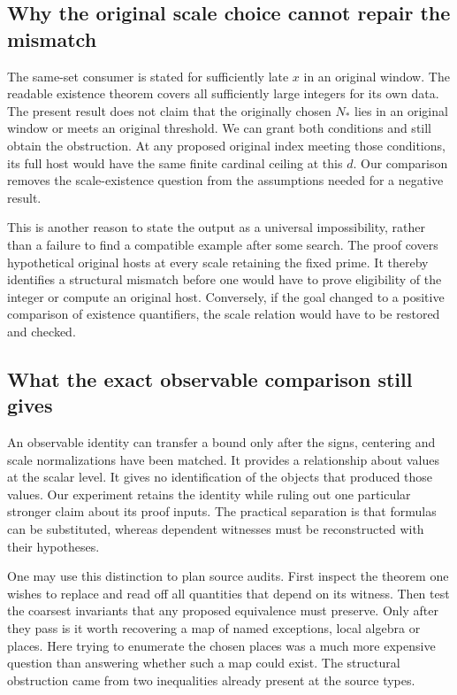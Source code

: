 \documentclass[12pt,letterpaper]{article}
\begin{document}
\subsection{Why the original scale choice cannot repair the mismatch}
The same-set consumer is stated for sufficiently late $x$ in an original window. The readable existence theorem covers all sufficiently large integers for its own data. The present result does not claim that the originally chosen $N_*$ lies in an original window or meets an original threshold. We can grant both conditions and still obtain the obstruction. At any proposed original index meeting those conditions, its full host would have the same finite cardinal ceiling at this $d$. Our comparison removes the scale-existence question from the assumptions needed for a negative result.

This is another reason to state the output as a universal impossibility, rather than a failure to find a compatible example after some search. The proof covers hypothetical original hosts at every scale retaining the fixed prime. It thereby identifies a structural mismatch before one would have to prove eligibility of the integer or compute an original host. Conversely, if the goal changed to a positive comparison of existence quantifiers, the scale relation would have to be restored and checked.

\subsection{What the exact observable comparison still gives}
An observable identity can transfer a bound only after the signs, centering and scale normalizations have been matched. It provides a relationship about values at the scalar level. It gives no identification of the objects that produced those values. Our experiment retains the identity while ruling out one particular stronger claim about its proof inputs. The practical separation is that formulas can be substituted, whereas dependent witnesses must be reconstructed with their hypotheses.

One may use this distinction to plan source audits. First inspect the theorem one wishes to replace and read off all quantities that depend on its witness. Then test the coarsest invariants that any proposed equivalence must preserve. Only after they pass is it worth recovering a map of named exceptions, local algebra or places. Here trying to enumerate the chosen places was a much more expensive question than answering whether such a map could exist. The structural obstruction came from two inequalities already present at the source types.
\end{document}
